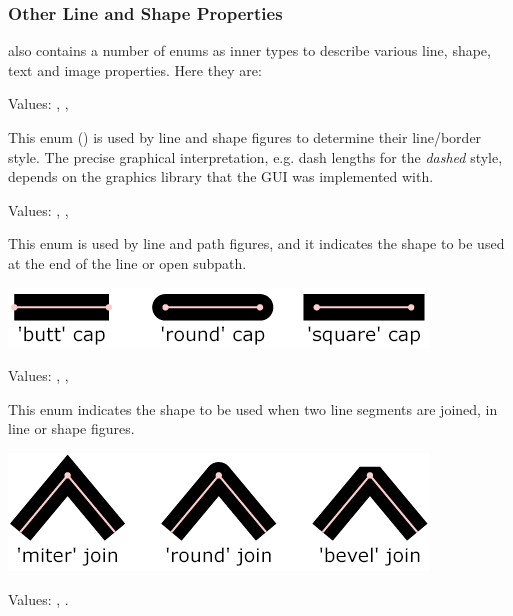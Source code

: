 \subsubsection{Other Line and Shape Properties}

 also contains a number of enums as inner types to describe
various line, shape, text and image properties. Here they are:


Values: , , 

This enum () is used by line and shape figures
to determine their line/border style. The precise graphical interpretation,
e.g. dash lengths for the \textit{dashed} style, depends on the graphics
library that the GUI was implemented with.


Values: , , 

This enum is used by line and path figures, and it indicates the shape to
be used at the end of the line or open subpath.

\begin{center}
\includegraphics[scale=0.8]{figures/graphics-linecaps}
\end{center}


Values: , , 

This enum indicates the shape to be used when two line segments are joined,
in line or shape figures.

\begin{center}
\includegraphics[scale=0.8]{figures/graphics-linejoins}
\end{center}


Values: , .

